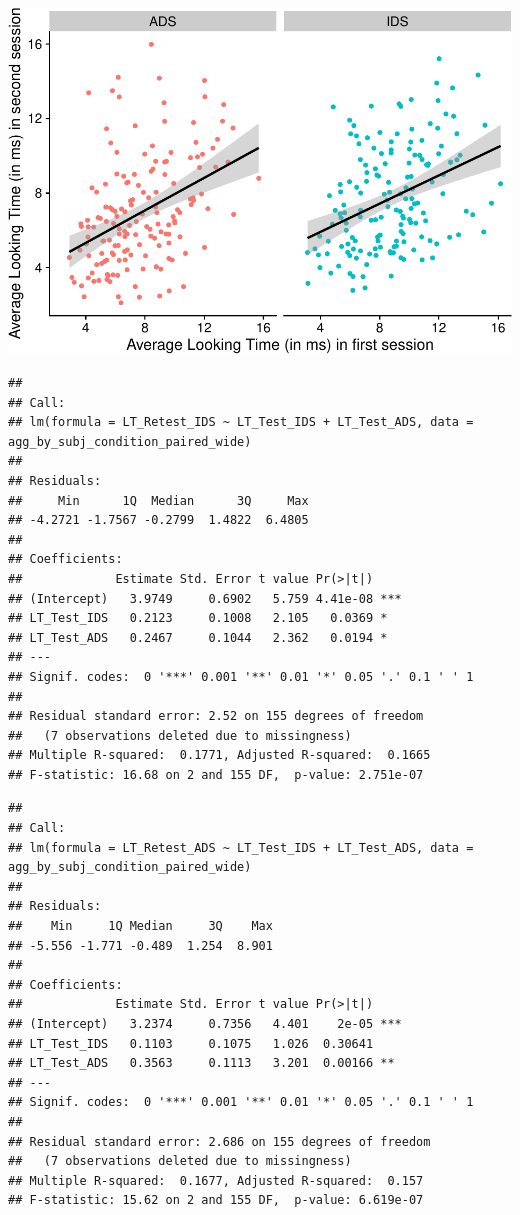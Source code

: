 \documentclass[
  man, donotrepeattitle,floatsintext]{apa6}
\begin{document}
\includegraphics{MB1T_supplement_files/figure-latex/unnamed-chunk-5-1.pdf}

\begin{verbatim}
## 
## Call:
## lm(formula = LT_Retest_IDS ~ LT_Test_IDS + LT_Test_ADS, data = agg_by_subj_condition_paired_wide)
## 
## Residuals:
##     Min      1Q  Median      3Q     Max 
## -4.2721 -1.7567 -0.2799  1.4822  6.4805 
## 
## Coefficients:
##             Estimate Std. Error t value Pr(>|t|)    
## (Intercept)   3.9749     0.6902   5.759 4.41e-08 ***
## LT_Test_IDS   0.2123     0.1008   2.105   0.0369 *  
## LT_Test_ADS   0.2467     0.1044   2.362   0.0194 *  
## ---
## Signif. codes:  0 '***' 0.001 '**' 0.01 '*' 0.05 '.' 0.1 ' ' 1
## 
## Residual standard error: 2.52 on 155 degrees of freedom
##   (7 observations deleted due to missingness)
## Multiple R-squared:  0.1771, Adjusted R-squared:  0.1665 
## F-statistic: 16.68 on 2 and 155 DF,  p-value: 2.751e-07
\end{verbatim}

\begin{verbatim}
## 
## Call:
## lm(formula = LT_Retest_ADS ~ LT_Test_IDS + LT_Test_ADS, data = agg_by_subj_condition_paired_wide)
## 
## Residuals:
##    Min     1Q Median     3Q    Max 
## -5.556 -1.771 -0.489  1.254  8.901 
## 
## Coefficients:
##             Estimate Std. Error t value Pr(>|t|)    
## (Intercept)   3.2374     0.7356   4.401    2e-05 ***
## LT_Test_IDS   0.1103     0.1075   1.026  0.30641    
## LT_Test_ADS   0.3563     0.1113   3.201  0.00166 ** 
## ---
## Signif. codes:  0 '***' 0.001 '**' 0.01 '*' 0.05 '.' 0.1 ' ' 1
## 
## Residual standard error: 2.686 on 155 degrees of freedom
##   (7 observations deleted due to missingness)
## Multiple R-squared:  0.1677, Adjusted R-squared:  0.157 
## F-statistic: 15.62 on 2 and 155 DF,  p-value: 6.619e-07
\end{verbatim}
\end{document}
